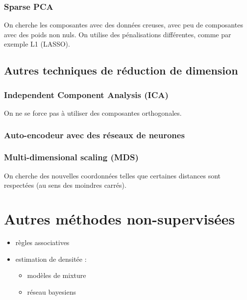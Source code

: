 		
		\subsubsection{Sparse PCA}
		
		On cherche les composantes avec des données creuses, avec peu de composantes avec des poids non nuls. On utilise des pénalisations différentes, comme par exemple L1 (LASSO).
		
	\subsection{Autres techniques de réduction de dimension}
	
		\subsubsection{Independent Component Analysis (ICA)}
		
		On ne se force pas à utiliser des composantes orthogonales.
		
		
		\subsubsection{Auto-encodeur avec des réseaux de neurones}
		
		
		\subsubsection{Multi-dimensional scaling (MDS)}
		
		On cherche des nouvelles coordonnées telles que certaines distances sont respectées (au sens des moindres carrés).
		
\section{Autres méthodes non-supervisées}

\begin{itemize}
	\item règles associatives
	\item estimation de densitée :
	
	\begin{itemize}
		\item modèles de mixture
		\item réseau bayesiens
	\end{itemize}
\end{itemize}